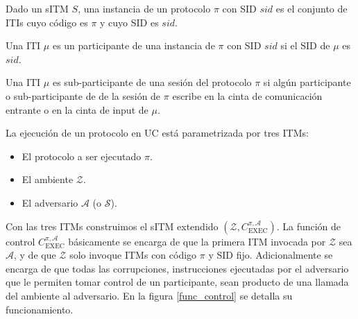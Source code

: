 \begin{definicion}
Dado un sITM $S$, una instancia de un protocolo $\pi$ con SID $sid$ es el conjunto de ITIs
cuyo código es $\pi$ y cuyo SID es $sid$.
\end{definicion}

\begin{definicion}[Participante]
Una ITI $\mu$ es un participante de una instancia de $\pi$ con SID $sid$ si el SID de $\mu$ es $sid$.
\end{definicion}

\begin{definicion}
Una ITI $\mu$ es sub-participante de una sesión del protocolo $\pi$ si algún participante o sub-participante
de de la sesión de $\pi$ escribe en la cinta de comunicación entrante o en la cinta de input de $\mu$.
\end{definicion}

La ejecución de un protocolo en UC está parametrizada por tres ITMs:

\begin{itemize}
    \item El protocolo a ser ejecutado $\pi$.
    \item El ambiente $\mathcal{Z}$.
    \item El adversario $\mathcal{A}$ (o $\mathcal{S}$).
\end{itemize}

Con las tres ITMs construimos el sITM  extendido $(\mathcal{Z}, C^{\pi, \mathcal{A}}_\mathrm{EXEC})$.
La función de control $C^{\pi, \mathcal{A}}_\mathrm{EXEC}$ básicamente se encarga de que la primera ITM
invocada por $\mathcal{Z}$ sea $\mathcal{A}$, y de que $\mathcal{Z}$ solo invoque ITMs con código $\pi$ y
SID fijo. Adicionalmente se encarga de que todas las corrupciones, instrucciones ejecutadas por el adversario
que le permiten tomar control de un participante, sean producto de una llamada del ambiente al adversario.
En la figura \ref{func_control} se detalla su funcionamiento.

